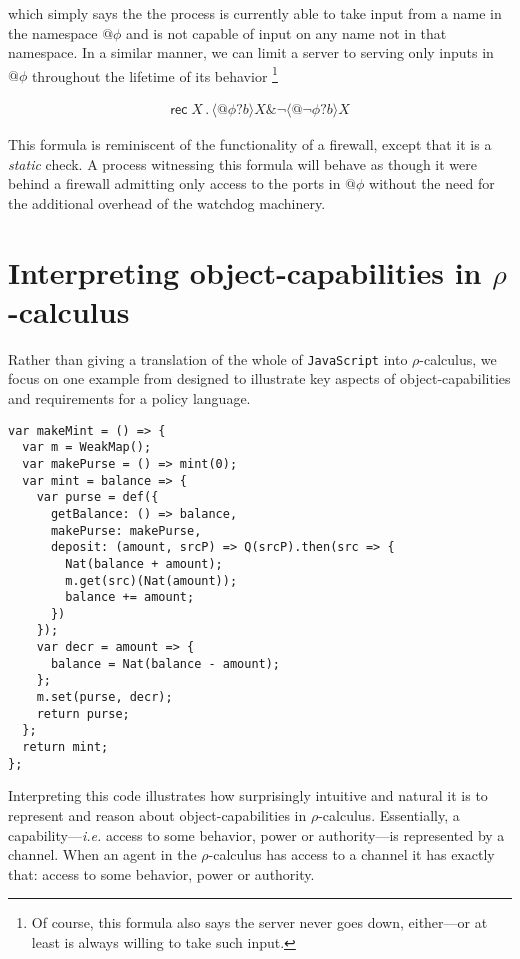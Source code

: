 \documentclass[]{amsart}
\makeatletter
\newcommand{\quotep}[1]{@#1}
\newcommand{\pprefix}[3]{\langle #1 ? #2 \rangle #3}
\newcommand{\pgfp}[2]{\textsf{rec} \; #1 \mathbin{.} #2}
\theoremstyle{definition}
\theoremstyle{remark}
\numberwithin{equation}{subsection}
\newcommand{\rhoc}{$\rho$-calculus}
\makeatother
\begin{document}
\noindent which simply says the the process is currently able to take input from
a name in the namespace $\quotep{\phi}$ and is not capable of input on
any name not in that namespace. In a similar manner, we can limit a
server to serving only inputs in $\quotep{\phi}$ throughout the
lifetime of its behavior \footnote{Of course, this formula also says
the server never goes down, either---or at least is always willing
to take such input.}

\begin{eqnarray}
  \pgfp{X}{\pprefix{\quotep{\phi}}{b}{X} \& \neg \pprefix{\quotep{\neg \phi}}{b}{X}} \nonumber
\end{eqnarray} 

This formula is reminiscent of the functionality of a firewall, except
that it is a \emph{static} check. A process witnessing this formula
will behave as though it were behind a firewall admitting only access
to the ports in $\quotep{\phi}$ without the need for the additional
overhead of the watchdog machinery.

\section{Interpreting object-capabilities in \rhoc}

Rather than giving a translation of the whole of {\tt JavaScript}
into \rhoc, we focus on one example from \cite{MvCT2013} designed
to illustrate key aspects of object-capabilities and requirements for
a policy language.

\begin{verbatim}
var makeMint = () => {
  var m = WeakMap();
  var makePurse = () => mint(0);
  var mint = balance => {
    var purse = def({
      getBalance: () => balance,
      makePurse: makePurse,
      deposit: (amount, srcP) => Q(srcP).then(src => {
        Nat(balance + amount);
        m.get(src)(Nat(amount));
        balance += amount;
      })
    });
    var decr = amount => {
      balance = Nat(balance - amount);
    };
    m.set(purse, decr);
    return purse;
  };
  return mint;
};
\end{verbatim}

Interpreting this code illustrates how surprisingly intuitive and
natural it is to represent and reason about object-capabilities in
\rhoc. Essentially, a capability---{\em i.e.} access to some behavior, power
or authority---is represented by a channel. When an agent in the \rhoc
has access to a channel it has exactly that: access to some behavior,
power or authority.
\end{document}
